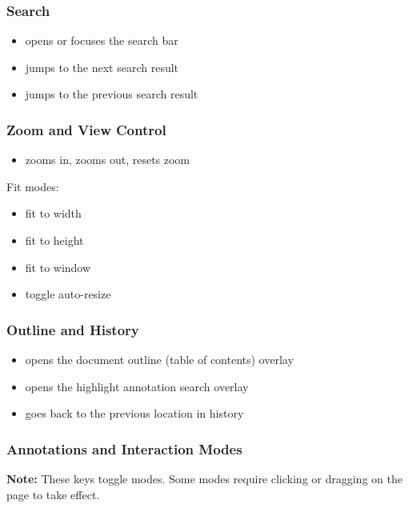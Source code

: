 \documentclass[a4paper,12pt]{article}
\begin{document}
\subsubsection{Search}
\begin{itemize}[leftmargin=*]
    \item \keys{/} opens or focuses the search bar
    \item {} jumps to the next search result
    \item {} jumps to the previous search result
\end{itemize}

\subsubsection{Zoom and View Control}
\begin{itemize}[leftmargin=*]
    \item \keys{=} zooms in, \quad \keys{-} zooms out, \quad {} resets zoom
\end{itemize}

Fit modes:
\begin{itemize}[leftmargin=*]
    \item {} fit to width
    \item {} fit to height
    \item {} fit to window
    \item {} toggle auto-resize
\end{itemize}

\subsubsection{Outline and History}
\begin{itemize}[leftmargin=*]
    \item {} opens the document outline (table of contents) overlay
    \item {} opens the highlight annotation search overlay
    \item {} goes back to the previous location in history
\end{itemize}

\subsubsection{Annotations and Interaction Modes}
\begin{ghnote}
    \textbf{Note:} These keys toggle modes. Some modes require clicking or dragging on the page to take effect.
\end{ghnote}
\end{document}
